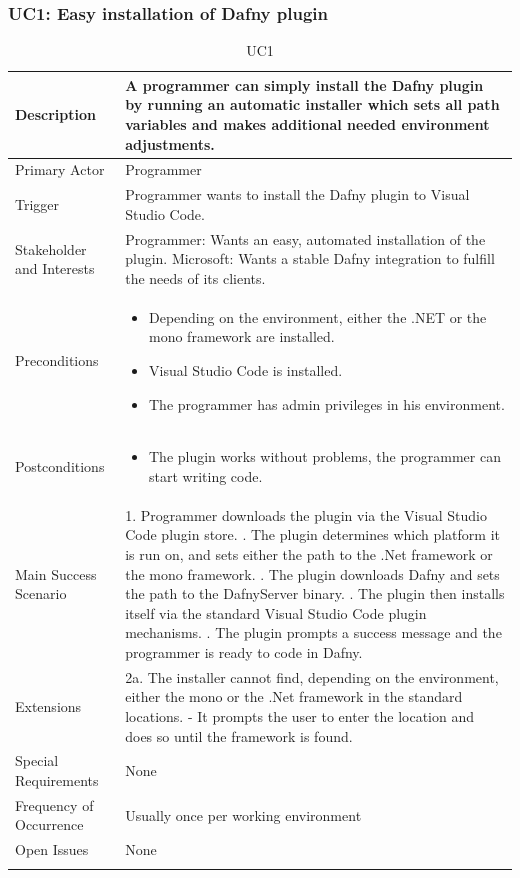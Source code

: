 \subsubsection{UC1: Easy installation of Dafny plugin}
\begin{longtable}{l | p{} }
	Description & A programmer can simply install the Dafny plugin by running an automatic installer which sets all path variables and makes additional needed environment adjustments.\\ \hline
	Primary Actor & Programmer\\ \hline
	Trigger & Programmer wants to install the Dafny plugin to Visual Studio Code.\\ \hline
	Stakeholder and Interests & Programmer: Wants an easy, automated installation of the plugin. \newline Microsoft: Wants a stable Dafny integration to fulfill the needs of its clients.\\ \hline
	Preconditions &\begin{itemize}
		\item Depending on the environment, either the .NET or the mono framework are installed.
		\item Visual Studio Code is installed.
		\item The programmer has admin privileges in his environment.
	\end{itemize}\\ \hline
	Postconditions & 
	\begin{itemize}
		\item The plugin works without problems, the programmer can start writing code.
	\end{itemize} \\ \hline
	Main Success Scenario & 
	1. Programmer downloads the plugin via the Visual Studio Code plugin store. \newline
	2. The plugin determines which platform it is run on, and sets either the path to the .Net framework or the mono framework. \newline
	3. The plugin downloads Dafny and sets the path to the DafnyServer binary. \newline
	4. The plugin then installs itself via the standard Visual Studio Code plugin mechanisms. \newline
	5. The plugin prompts a success message and the programmer is ready to code in Dafny.\\ \hline
	Extensions & 
	2a. The installer cannot find, depending on the environment, either the mono or the .Net framework in the standard locations. \newline 
	- It prompts the user to enter the location and does so until the framework is found. \\ \hline
	Special Requirements & None\\ \hline
	Frequency of Occurrence & Usually once per working environment\\ \hline
	Open Issues & None \\ \hline
	\caption{UC1}
\end{longtable}

